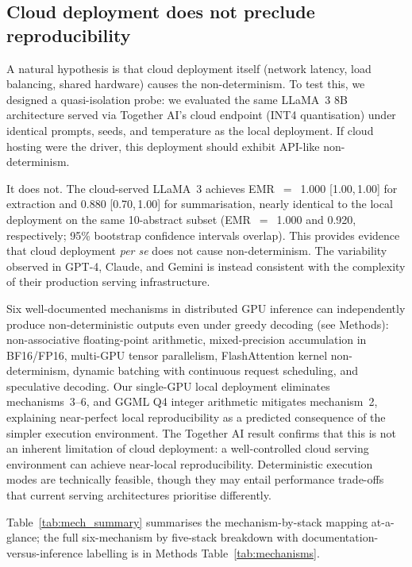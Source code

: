 \documentclass[sn-nature]{sn-jnl}
\begin{document}
\subsection{Cloud deployment does not preclude reproducibility}\label{subsec:cloud}

A natural hypothesis is that cloud deployment itself (network latency, load balancing, shared hardware) causes the non-determinism.
To test this, we designed a quasi-isolation probe: we evaluated the same LLaMA~3 8B architecture served via Together AI's cloud endpoint (INT4 quantisation) under identical prompts, seeds, and temperature as the local deployment.
If cloud hosting were the driver, this deployment should exhibit API-like non-determinism.

It does not.
The cloud-served LLaMA~3 achieves EMR~$=$~1.000 [1.00,\,1.00] for extraction and 0.880 [0.70,\,1.00] for summarisation, nearly identical to the local deployment on the same 10-abstract subset (EMR~$=$~1.000 and 0.920, respectively; 95\% bootstrap confidence intervals overlap).
This provides evidence that cloud deployment \emph{per se} does not cause non-determinism. The variability observed in GPT-4, Claude, and Gemini is instead consistent with the complexity of their production serving infrastructure.

Six well-documented mechanisms in distributed GPU inference can independently produce non-deterministic outputs even under greedy decoding (see Methods): non-associative floating-point arithmetic\cite{higham2002accuracy}, mixed-precision accumulation in BF16/FP16\cite{yuan2025nondeterminism}, multi-GPU tensor parallelism\cite{shoeybi2019megatron}, FlashAttention kernel non-determinism\cite{dao2022flashattention}, dynamic batching with continuous request scheduling\cite{kwon2023vllm}, and speculative decoding\cite{leviathan2023speculative}.
Our single-GPU local deployment eliminates mechanisms~3--6, and GGML Q4 integer arithmetic mitigates mechanism~2, explaining near-perfect local reproducibility as a predicted consequence of the simpler execution environment.
The Together AI result confirms that this is not an inherent limitation of cloud deployment: a well-controlled cloud serving environment can achieve near-local reproducibility.
Deterministic execution modes are technically feasible, though they may entail performance trade-offs that current serving architectures prioritise differently.

Table~\ref{tab:mech_summary} summarises the mechanism-by-stack mapping at-a-glance; the full six-mechanism by five-stack breakdown with documentation-versus-inference labelling is in Methods Table~\ref{tab:mechanisms}.
\end{document}
